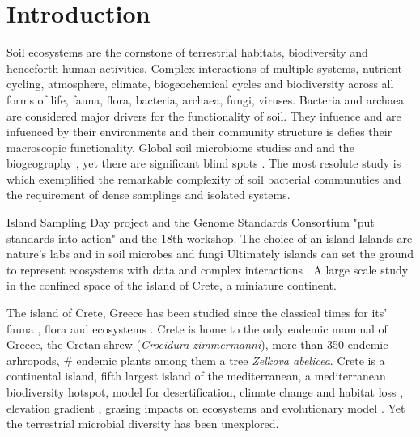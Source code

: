 \documentclass[unnumsec,webpdf,contemporary,large]{oup-authoring-template}%
\theoremstyle{thmstyleone}%
\theoremstyle{thmstyletwo}%
\theoremstyle{thmstylethree}%
\begin{document}


\maketitle


\section{Introduction}\label{intro}

Soil ecosystems are the cornstone of terrestrial habitats, biodiversity and henceforth human activities.
Complex interactions of multiple systems, nutrient cycling, atmosphere, climate, biogeochemical cycles and biodiversity 
across all forms of life, fauna, flora, bacteria, archaea, fungi, viruses. 
Bacteria and archaea are considered major drivers for the functionality of soil.
They infuence and are infuenced by their environments and their community structure 
is defies their macroscopic functionality.
Global soil microbiome studies \citep{Delgado-Baquerizo2018} and \citep{Bahram2018} and the biogeography \citep{Martiny2006} \citep{Guerra2020}, \citep{Labouyrie2023} yet there are significant blind spots \citep{Guerra2020}. The most resolute study is \citep{Karimi2020} which exemplified the 
remarkable complexity of soil bacterial communuties and the requirement of  dense samplings and isolated systems. 

Island Sampling Day project and the 
Genome Standards Consortium \citep{Field2011} "put standards into action" and the 
18th workshop. 
The choice of an island
Islands are nature's labs \citep{Whittaker2017} and in soil microbes \citep{Li2020} and fungi \citep{Delavaux2021}
Ultimately islands can set the ground to represent ecosystems with data and complex interactions \citep{Davies2016}.
A large scale study in the confined space of the island of Crete, a miniature continent.


The island of Crete, Greece has been studied since the classical times for its' fauna \citep{Sidiropoulos_Polymeni_Legakis_2017,Anastasiou2018Tenebrionid}, flora \citep{Krimbas_2005} and ecosystems \citep{Grove1993}.
Crete is home to the only endemic mammal of Greece, the Cretan shrew (\textit{Crocidura zimmermanni}), more than 350 endemic arhropods, \# endemic plants among them a tree \textit{Zelkova abelicea}.
Crete is a continental island, fifth largest island of the mediterranean, a mediterranean biodiversity hotspot, model for desertification, climate change \citep{Kougioumoutzis2020} and habitat loss \citep{ISPIKOUDIS1993259},
elevation gradient \citep{trigas2013, FAZAN2017}, grasing impacts on ecosystems \citep{JouffroyBapicot2016} and evolutionary model \citep{POULAKAKIS2002}.
Yet the terrestrial microbial diversity has been unexplored.
\end{document}
